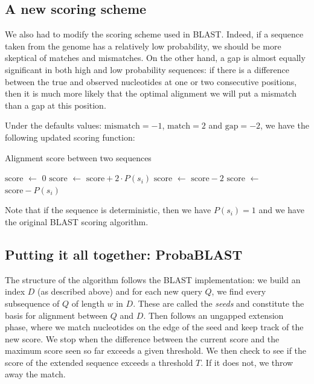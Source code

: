 \documentclass[11pt]{IEEEtran}
\newcommand*\Let[2]{\State #1 $\gets$ #2}
\begin{document}
\subsection{A new scoring scheme}

We also had to modify the scoring scheme used in BLAST. Indeed, if a sequence taken from the genome has a relatively low probability, we should be more skeptical of matches and mismatches. On the other hand, a gap is almost equally significant in both high and low probability sequences: if there is a difference between the true and observed nucleotides at one or two consecutive positions, then it is much more likely that the optimal alignment we will put a mismatch than a gap at this position.

Under the defaults values: $\text{mismatch}= -1$, $\text{match}= 2$ and $\text{gap} = -2$, we have the following updated scoring function:

\begin{algorithm}
  \caption{Alignment score between two sequences
    \label{alg:score}}
  \begin{algorithmic}[1]
    \Statex
      \Let{$\text{score}$}{$0$}
            \Let{$\text{score}$}{$\text{score} + 2\cdot P(s_i)$}
    \Let{$\text{score}$}{$\text{score} - 2$}
  \Else 
    \Let{$\text{score}$}{$\text{score} - P(s_i)$}
        \EndIf
      \EndFor
      \State {}
    \EndFunction
  \end{algorithmic}
\end{algorithm}

Note that if the sequence is deterministic, then we have $P(s_i) = 1$ and we have the original BLAST scoring algorithm. 

\subsection{Putting it all together: ProbaBLAST}

The structure of the algorithm follows the BLAST implementation: we build an index $D$ (as described above) and for each new query $Q$, we find every subsequence of $Q$ of length $w$ in $D$. These are called the \emph{seeds} and constitute the basis for alignment between $Q$ and $D$. Then follows an ungapped extension phase, where we match nucleotides on the edge of the seed and keep track of the new score. We stop when the difference between the current score and the maximum score seen so far exceeds a given threshold. We then check to see if the score of the extended sequence exceeds a threshold $T$. If it does not, we throw away the match. 
\end{document}

